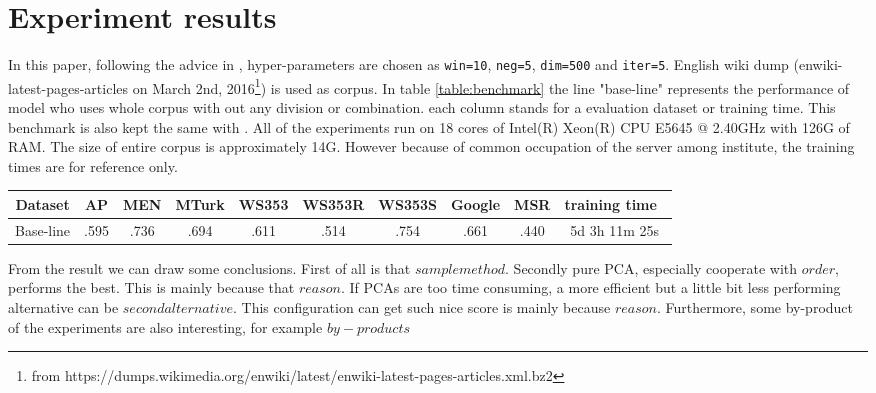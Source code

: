 \section{Experiment results} \label{experiment_results}
In this paper, following the advice in \cite{levy2015improving}, hyper-parameters are chosen as \verb|win=10|, \verb|neg=5|, \verb|dim=500| and \verb|iter=5|. English wiki dump (enwiki-latest-pages-articles on March 2nd, 2016\footnote{from https://dumps.wikimedia.org/enwiki/latest/enwiki-latest-pages-articles.xml.bz2}) is used as corpus. In table \ref{table:benchmark} the line "base-line" represents the performance of model who uses whole corpus with out any division or combination. each column stands for a evaluation dataset or training time. This benchmark is also kept the same with \cite{levy2015improving}. All of the experiments run on 18 cores of Intel(R) Xeon(R) CPU E5645 @ 2.40GHz with 126G of RAM. The size of entire corpus is approximately 14G. However because of common occupation of the server among institute, the training times are for reference only.

\begin{table*}
\caption{Performance and training time of different combination strategies}
\begin{tabular}{c|cccccccc|c}
\hline
Dataset   & AP   & MEN  & MTurk & WS353 & WS353R & WS353S & Google & MSR  & training time\ \tabularnewline \hline
Base-line & .595 & .736 & .694  & .611  & .514   & .754   & .661   & .440 & 5d 3h 11m 25s\\ \hline
\end{tabular}
\label{table:benchmark}
\end{table*}

From the result we can draw some conclusions. First of all is that $sample method$. Secondly pure PCA, especially cooperate with $order$, performs the best. This is mainly because that $reason$. If PCAs are too time consuming, a more efficient but a little bit less performing alternative can be $second alternative$. This configuration can get such nice score is mainly because $reason$. Furthermore, some by-product of the experiments are also interesting, for example $by-products$
